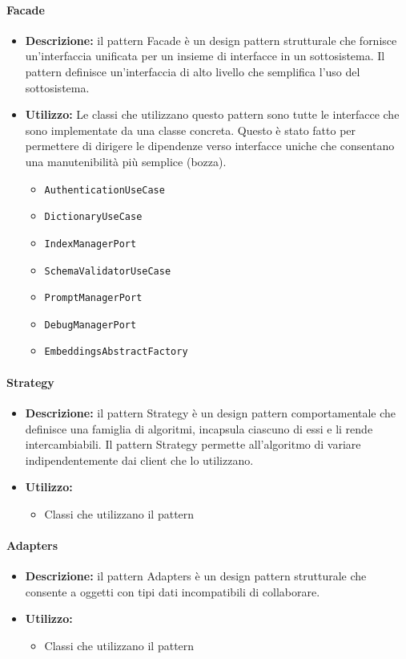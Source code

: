 \paragraph{Facade}
\begin{itemize}
    \item{\textbf{Descrizione:}} il pattern Facade è un design pattern strutturale che fornisce un'interfaccia unificata per un insieme di interfacce in un sottosistema. Il pattern definisce un'interfaccia di alto livello che semplifica l'uso del sottosistema.
    \item{\textbf{Utilizzo:}} Le classi che utilizzano questo pattern sono tutte le interfacce che sono implementate da una classe concreta. Questo è stato fatto per permettere di dirigere le dipendenze verso interfacce uniche che consentano una manutenibilità più semplice (bozza).
    \begin{itemize}
        \item \texttt{AuthenticationUseCase}
        \item \texttt{DictionaryUseCase}
        \item \texttt{IndexManagerPort}
        \item \texttt{SchemaValidatorUseCase}
        \item \texttt{PromptManagerPort}
        \item \texttt{DebugManagerPort}
        \item \texttt{EmbeddingsAbstractFactory}
    \end{itemize}
\end{itemize}

\paragraph{Strategy}
\begin{itemize}
    \item{\textbf{Descrizione:}} il pattern Strategy è un design pattern comportamentale che definisce una famiglia di algoritmi, incapsula ciascuno di essi e li rende intercambiabili. Il pattern Strategy permette all'algoritmo di variare indipendentemente dai client che lo utilizzano.
    \item{\textbf{Utilizzo:}}
    \begin{itemize}
        \item Classi che utilizzano il pattern
    \end{itemize}
\end{itemize}

\paragraph{Adapters}
\begin{itemize}
    \item{\textbf{Descrizione:}} il pattern Adapters è un design pattern strutturale che consente a oggetti con tipi dati incompatibili di collaborare.
    \item{\textbf{Utilizzo:}}
    \begin{itemize}
        \item Classi che utilizzano il pattern
    \end{itemize}
\end{itemize}

